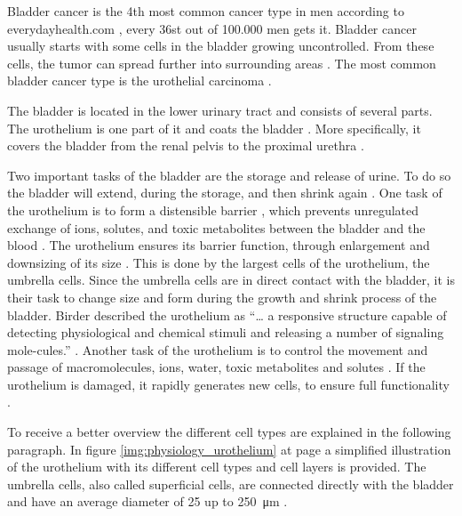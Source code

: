 Bladder cancer is the 4th most common cancer type in men according to everydayhealth.com \cite{EveryDayHealth.com}, every 36st out of 100.000 men gets it. Bladder cancer usually starts with some cells in the bladder growing uncontrolled. From these cells, the tumor can spread further into surrounding areas \cite{Cancer.org}. The most common bladder cancer type is the urothelial carcinoma \cite{Cancer.org}.

The bladder is located in the lower urinary tract and consists of several parts. The urothelium is one part of it and coats the bladder \cite{Lazzeri2006}. More specifically, it covers the bladder from the renal pelvis to the proximal urethra \cite{Yamany2014, Birder2005}.

Two important tasks of the bladder are the storage and release of urine. To do so the bladder will extend, during the storage, and then shrink again \cite{Karl-ErikAndersson2004}. One task of the urothelium is to form a distensible barrier \cite{Apodaca2004, Lazzeri2006, PuneetKhandelwal2009, Lewis2000, WRCross2005}, which prevents unregulated exchange of ions, solutes, and toxic metabolites between the bladder and the blood \cite{Apodaca2004, Lazzeri2006, PuneetKhandelwal2009, Lewis2000}. The urothelium ensures its barrier function, through enlargement and downsizing of its size . This is done by the largest cells of the urothelium, the umbrella cells. Since the umbrella cells are in direct contact with the bladder, it is their task to change size and form during the growth and shrink process of the bladder. Birder described the urothelium as “… a responsive structure capable of detecting physiological and chemical stimuli and releasing a number of signaling mole-cules.” \cite{Birder2005}. Another task of the urothelium is to control the movement and passage of macromolecules, ions, water, toxic metabolites and solutes \cite{Apodaca2004, PuneetKhandelwal2009}. If the urothelium is damaged, it rapidly generates new cells, to ensure full functionality \cite{Apodaca2004, Yamany2014, PuneetKhandelwal2009}.

To receive a better overview the different cell types are explained in the following paragraph. In figure \ref{img:physiology_urothelium} at page \pageref{img:physiology_urothelium} a simplified illustration of the urothelium with its different cell types and cell layers is provided. \newline
The umbrella cells, also called superficial cells, are connected directly with the bladder and have an average diameter of 25 up to \SI{250}{\micro\metre} \cite{Yamany2014, PuneetKhandelwal2009}. 

